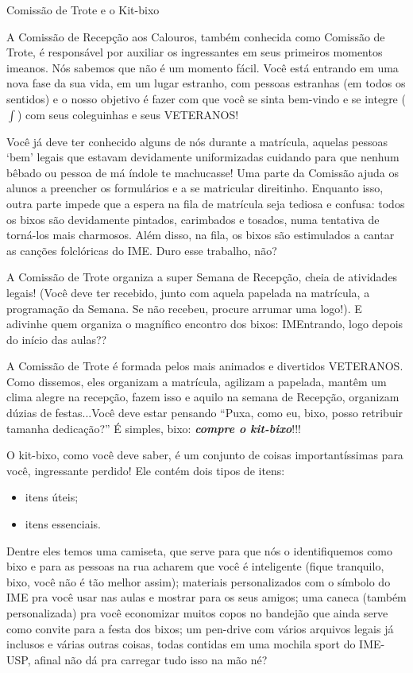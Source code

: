 \begin{secao}{Comissão de Trote e o Kit-bixo}

A Comissão de Recepção aos Calouros, também conhecida como Comissão de Trote,
é responsável por auxiliar os ingressantes em seus primeiros momentos imeanos.
Nós sabemos que não é um momento fácil. Você está entrando em uma nova fase da
sua vida, em um lugar estranho, com pessoas estranhas (em todos os sentidos) e
o nosso objetivo é fazer com que você se sinta bem-vindo e se integre ($\int$)
com seus coleguinhas e seus VETERANOS!

Você já deve ter conhecido alguns de nós durante a matrícula, aquelas pessoas
`bem' legais que estavam devidamente uniformizadas cuidando para que nenhum
bêbado ou pessoa de má índole te machucasse! Uma parte da Comissão ajuda os
alunos a preencher os formulários e a se matricular direitinho. Enquanto isso,
outra parte impede que a espera na fila de matrícula seja tediosa e confusa:
todos os bixos são devidamente pintados, carimbados e tosados, numa tentativa
de torná-los mais charmosos. Além disso, na fila, os bixos são estimulados a
cantar as canções folclóricas do IME. Duro esse trabalho, não?

A Comissão de Trote organiza a super Semana de Recepção, cheia de atividades
legais! (Você deve ter recebido, junto com aquela papelada na matrícula, a
programação da Semana. Se não recebeu, procure arrumar uma logo!).
E adivinhe quem organiza o magnífico encontro dos bixos: IMEntrando, logo depois
do início das aulas??

A Comissão de Trote é formada pelos mais animados e divertidos VETERANOS. Como
dissemos, eles organizam a matrícula, agilizam a papelada, mantêm um clima
alegre na recepção, fazem isso e aquilo na semana de Recepção, organizam dúzias
de festas...Você deve estar pensando ``Puxa, como eu, bixo, posso retribuir
tamanha dedicação?'' É simples, bixo: {\bf\em compre o kit-bixo}!!!

O kit-bixo, como você deve saber, é um conjunto de coisas importantíssimas
para você, ingressante perdido! Ele contém dois tipos de itens:
\begin{itemize}
\item itens úteis;
\item itens essenciais. 
\end{itemize}
Dentre eles temos uma camiseta, que serve para que
nós o identifiquemos como bixo e para as pessoas na rua acharem que você é
inteligente (fique tranquilo, bixo, você não é tão melhor assim); materiais 
personalizados com o símbolo do IME pra você usar nas aulas e mostrar para os seus amigos;
uma caneca (também personalizada) pra você economizar muitos copos no bandejão
que ainda serve como convite para a festa dos bixos;
um pen-drive com vários arquivos legais já inclusos e várias outras coisas,
todas contidas em uma mochila sport do IME-USP, afinal não dá pra carregar tudo
isso na mão né?


\end{secao}
